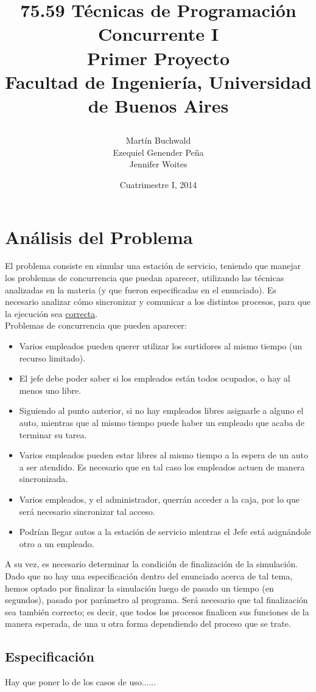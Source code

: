 \documentclass[a4paper,12pt]{article}
\author{Martín Buchwald \\ Ezequiel Genender Peña \\ Jennifer Woites}
\title{75.59 Técnicas de Programación Concurrente I\\
	\textbf{Primer Proyecto}\\
	Facultad de Ingeniería, Universidad de Buenos Aires
	\date{Cuatrimestre I, 2014}
}
\begin{document}
\maketitle
\thispagestyle{empty}
\newpage
\tableofcontents
\newpage

\section{Análisis del Problema}
El problema consiste en simular una estación de servicio, teniendo que manejar los problemas de concurrencia que puedan aparecer, utilizando las técnicas analizadas en la materia (y que fueron especificadas en el enunciado). Es necesario analizar cómo sincronizar y comunicar a los distintos procesos, para que la ejecución sea \underline{correcta}.\\
Problemas de concurrencia que pueden aparecer:
\begin{itemize}
	\item Varios empleados pueden querer utilizar los surtidores al mismo tiempo (un recurso
	 limitado).
	\item El jefe debe poder saber si los empleados están todos ocupados, o hay al menos uno
	 libre.
	\item Siguiendo al punto anterior, si no hay empleados libres	 asignarle a alguno el auto,
	 mientras que al mismo tiempo puede haber un empleado que acaba de terminar su tarea.
	\item Varios empleados pueden estar libres al mismo tiempo a la espera de un auto a ser
	 atendido. Es necesario que en tal caso los empleados actuen de manera sincronizada.
	\item Varios empleados, y el administrador, querrán acceder a la caja, por lo que será
	necesario sincronizar tal acceso.
	\item Podrían llegar autos a la estación de servicio mientras el Jefe está asignándole
	otro a un empleado. 
\end{itemize}
A su vez, es necesario determinar la condición de finalización de la simulación. Dado que no hay una especificación dentro del enunciado acerca de tal tema, hemos optado por finalizar la simulación luego de pasado un tiempo (en segundos), pasado por parámetro al programa. Será necesario que tal finalización sea también correcto; es decir, que todos los procesos finalicen sus funciones de la manera esperada, de una u otra forma dependiendo del proceso que se trate.

\subsection{Especificación}
Hay que poner lo de los casos de uso...... 
\end{document}
